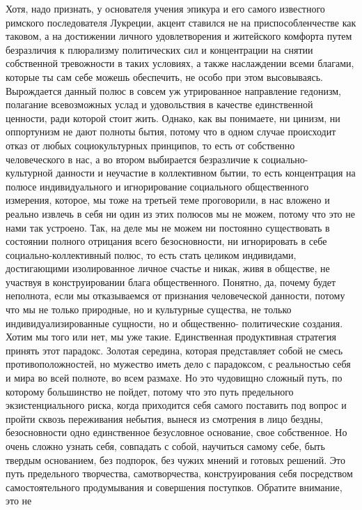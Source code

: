 Хотя, надо признать, у основателя учения эпикура и его самого известного
римского последователя Лукреции, акцент ставился не на приспособленчестве как
таковом, а на достижении личного удовлетворения и житейского комфорта путем
безразличия к плюрализму политических сил и концентрации на снятии собственной
тревожности в таких условиях, а также наслаждении всеми благами, которые ты сам
себе можешь обеспечить, не особо при этом высовываясь. Вырождается данный полюс
в совсем уж утрированное направление гедонизм, полагание всевозможных услад и
удовольствия в качестве единственной ценности, ради которой стоит жить. Однако,
как вы понимаете, ни цинизм, ни оппортунизм не дают полноты бытия, потому что в
одном случае происходит отказ от любых социокультурных принципов, то есть от
собственно человеческого в нас, а во втором выбирается безразличие к социально-
культурной данности и неучастие в коллективном бытии, то есть концентрация на
полюсе индивидуального и игнорирование социального общественного измерения,
которое, мы тоже на третьей теме проговорили, в нас вложено и реально извлечь в
себя ни один из этих полюсов мы не можем, потому что это не нами так устроено.
Так, на деле мы не можем ни постоянно существовать в состоянии полного отрицания
всего безосновности, ни игнорировать в себе социально-коллективный полюс, то
есть стать целиком индивидами, достигающими изолированное личное счастье и
никак, живя в обществе, не участвуя в конструировании блага общественного.
Понятно, да, почему будет неполнота, если мы отказываемся от признания
человеческой данности, потому что мы не только природные, но и культурные
существа, не только индивидуализированные сущности, но и общественно-
политические создания. Хотим мы того или нет, мы уже такие. Единственная
продуктивная стратегия принять этот парадокс. Золотая середина, которая
представляет собой не смесь противоположностей, но мужество иметь дело с
парадоксом, с реальностью себя и мира во всей полноте, во всем размахе. Но это
чудовищно сложный путь, по которому большинство не пойдет, потому что это путь
предельного экзистенциального риска, когда приходится себя самого поставить под
вопрос и пройти сквозь переживания небытия, вынеся из смотрения в лицо бездны,
безосновности одно единственное безусловное основание, свое собственное. Но
очень сложно узнать себя, совпадать с собой, научиться самому себе, быть твердым
основанием, без подпорок, без чужих мнений и готовых решений. Это путь
предельного творчества, самотворчества, конструирования себя посредством
самостоятельного продумывания и совершения поступков. Обратите внимание, это не
